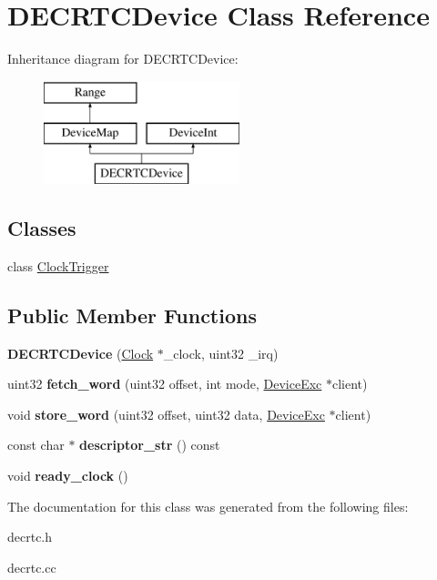 \hypertarget{classDECRTCDevice}{
\section{DECRTCDevice Class Reference}
\label{classDECRTCDevice}
}
Inheritance diagram for DECRTCDevice:\begin{figure}[H]
\begin{center}
\leavevmode
\includegraphics[height=3cm]{classDECRTCDevice}
\end{center}
\end{figure}
\subsection*{Classes}
\begin{DoxyCompactItemize}
\item 
class \hyperlink{classDECRTCDevice_1_1ClockTrigger}{ClockTrigger}
\end{DoxyCompactItemize}
\subsection*{Public Member Functions}
\begin{DoxyCompactItemize}
\item 
\hypertarget{classDECRTCDevice_a1f73f358dc6fb4714cb983696a549a94}{
{\bfseries DECRTCDevice} (\hyperlink{classClock}{Clock} $\ast$\_\-clock, uint32 \_\-irq)}
\label{classDECRTCDevice_a1f73f358dc6fb4714cb983696a549a94}

\item 
\hypertarget{classDECRTCDevice_a89869f71b157a3c6c81a7be897d0e223}{
uint32 {\bfseries fetch\_\-word} (uint32 offset, int mode, \hyperlink{classDeviceExc}{DeviceExc} $\ast$client)}
\label{classDECRTCDevice_a89869f71b157a3c6c81a7be897d0e223}

\item 
\hypertarget{classDECRTCDevice_ad9c476569ab6e229da0ecb9e610f4efb}{
void {\bfseries store\_\-word} (uint32 offset, uint32 data, \hyperlink{classDeviceExc}{DeviceExc} $\ast$client)}
\label{classDECRTCDevice_ad9c476569ab6e229da0ecb9e610f4efb}

\item 
\hypertarget{classDECRTCDevice_a0e319a33e2e91b94f787a4043b796baa}{
const char $\ast$ {\bfseries descriptor\_\-str} () const }
\label{classDECRTCDevice_a0e319a33e2e91b94f787a4043b796baa}

\item 
\hypertarget{classDECRTCDevice_a1e79a0b3fecf8a717dee6454c1f830e0}{
void {\bfseries ready\_\-clock} ()}
\label{classDECRTCDevice_a1e79a0b3fecf8a717dee6454c1f830e0}

\end{DoxyCompactItemize}


The documentation for this class was generated from the following files:\begin{DoxyCompactItemize}
\item 
decrtc.h\item 
decrtc.cc\end{DoxyCompactItemize}
